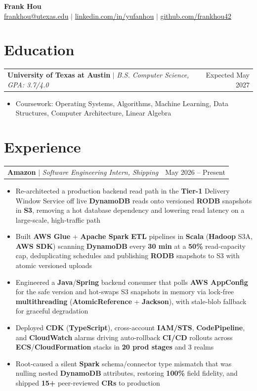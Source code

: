 \documentclass[letterpaper,10pt]{article}
\makeatletter
\newcommand{\resumeWorkHeading}[2]{%
  \vspace{1pt}\noindent
  \begin{tabular*}{\textwidth}{@{}l@{\extracolsep{\fill}}r@{}}
    #1 & #2 \\
  \end{tabular*}%
  \vspace{-4pt}
}
\newcommand{\resumeItemListStart}{\begin{itemize}}
\newcommand{\resumeItemListEnd}{\end{itemize}\vspace{0pt}}
\newcommand{\resumeItem}[1]{\item #1}
\makeatother
\begin{document}
\begin{center}
  {\huge \textbf{Frank Hou}} \\[2pt]
  \small
  \href{mailto:frankhou@utexas.edu}{frankhou@utexas.edu} $|$
  \href{https://linkedin.com/in/yufanhou}{linkedin.com/in/yufanhou} $|$
  \href{https://github.com/frankhou42}{github.com/frankhou42}
\end{center}
\vspace{-6pt}

\section{Education}
\resumeWorkHeading
{\textbf{University of Texas at Austin} $|$ \emph{B.S. Computer Science, GPA: 3.7/4.0}}{Expected May 2027}
\resumeItemListStart
\resumeItem{Coursework: Operating Systems, Algorithms, Machine Learning, Data Structures, Computer Architecture, Linear Algebra}
\resumeItemListEnd

\section{Experience}
\resumeWorkHeading
{\textbf{Amazon} $|$ \emph{Software Engineering Intern, Shipping}}{May 2026 -- Present}
\resumeItemListStart
\resumeItem{Re-architected a production backend read path in the \textbf{Tier-1} Delivery Window Service off live \textbf{DynamoDB} reads onto versioned \textbf{RODB} snapshots in \textbf{S3}, removing a hot database dependency and lowering read latency on a large-scale, high-traffic path}
\resumeItem{Built \textbf{AWS Glue} + \textbf{Apache Spark} \textbf{ETL} pipelines in \textbf{Scala} (\textbf{Hadoop} S3A, \textbf{AWS SDK}) scanning \textbf{DynamoDB} every \textbf{30 min} at a \textbf{50\%} read-capacity cap, deduplicating schedules and publishing \textbf{RODB} snapshots to S3 with atomic versioned uploads}
\resumeItem{Engineered a \textbf{Java}/\textbf{Spring} backend consumer that polls \textbf{AWS AppConfig} for the safe version and hot-swaps S3 snapshots in memory via lock-free \textbf{multithreading} (\textbf{AtomicReference} + \textbf{Jackson}), with stale-blob fallback for graceful degradation}
\resumeItem{Deployed \textbf{CDK} (\textbf{TypeScript}), cross-account \textbf{IAM/STS}, \textbf{CodePipeline}, and \textbf{CloudWatch} alarms driving auto-rollback \textbf{CI/CD} rollouts across \textbf{ECS}/\textbf{CloudFormation} stacks in \textbf{20 prod stages} and 3 realms}
\resumeItem{Root-caused a silent \textbf{Spark} schema/connector type mismatch that was nulling nested \textbf{DynamoDB} attributes, restoring \textbf{100\%} field fidelity, and shipped \textbf{15+} peer-reviewed \textbf{CRs} to production}
\resumeItemListEnd
\end{document}
